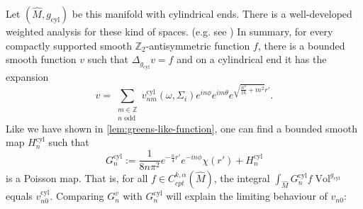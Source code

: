 \documentclass[preprint,12pt]{elsarticle}
\numberwithin{table}{section}
\newcommand{\Z}{\mathbb{Z}}
\newcommand{\Vol}{\operatorname{Vol}}
\begin{document}
Let $(\hat M, g_{\mathrm{cyl}})$ be this manifold with cylindrical ends. There is a well-developed weighted analysis for these kind of spaces. (e.g. see \cite{Pacard2008}) In summary, for every compactly supported smooth $\Z_2$-antisymmetric function $f$, there is a bounded smooth function $v$ such that $\Delta_{g_{\mathrm{cyl}}} v = f$ and on a cylindrical end it has the expansion
$$
v = \sum_{\substack{m \in \Z \\ n \text{ odd}}} v_{nm}^{\mathrm{cyl}}(\omega, \Sigma_i) e^{in \phi} e^{im \theta} e^{\sqrt{\frac{n^2}{16} + m^2} r'}.
$$
Like we have shown in \cref{lem:greens-like-function}, one can find a bounded smooth map $H^{\mathrm{cyl}}_n$ such that
\begin{equation}
	\label{eq:limit:def-G^cyl}
	G_n^{\mathrm{cyl}} := \frac{1}{8 n \pi^2} e^{ - \frac{n}{4} r'} e^{- i n \phi} \chi(r') + H_n^{\mathrm{cyl}}
\end{equation}
is a Poisson map. That is, for all $f \in C^{k, \alpha}_{cpt}(\hat{M})$, the integral $\int_{\hat M} G^{\mathrm{cyl}}_n f \Vol^{g_{\mathrm{cyl}}}$ equals $v^{\mathrm{cyl}}_{n0}$.
Comparing $G^{v}_n$ with $G^{\mathrm{cyl}}_n$ will explain the limiting behaviour of $v_{n0}$:
\end{document}
